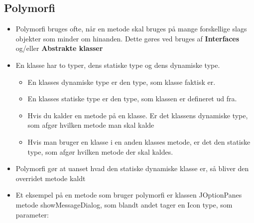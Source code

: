 \documentclass{article}
\begin{document}
\subsection{Polymorfi}
\begin{itemize}
	\item Polymorfi bruges ofte, når en metode skal bruges på mange forskellige slags objekter som minder om hinanden. Dette gøres ved bruges af \textbf{Interfaces} og/eller \textbf{Abstrakte klasser} 
	\item En klasse har to typer, dens statiske type og dens dynamiske type.
	\begin{itemize}
		\item En klasses dynamiske type er den type, som klasse faktisk er.
		\item En klasses statiske type er den type, som klassen er defineret ud fra.
		\item Hvis du kalder en metode på en klasse. Er det klassens dynamiske type, som afgør hvilken metode man skal kalde
		\item Hvis man bruger en klasse i en anden klasses metode, er det den statiske type, som afgør hvilken metode der skal kaldes.  
	\end{itemize}
	\item Polymorfi gør at uanset hvad den statiske dynamiske klasse er, så bliver den overridet metode kaldt
	\item Et eksempel på en metode som bruger polymorfi er klassen JOptionPanes metode showMessageDialog, som blandt andet tager en Icon type, som parameter:	
\end{itemize}
\end{document}
